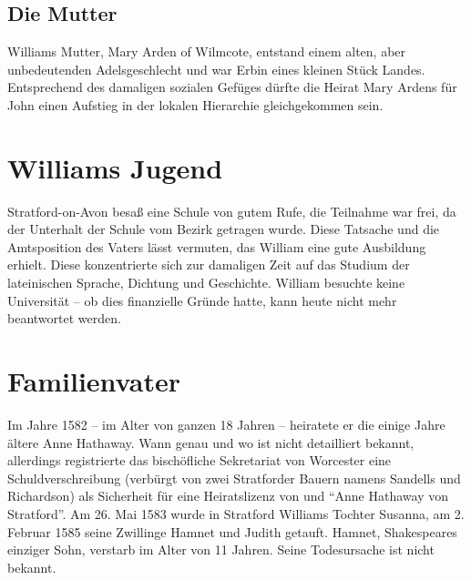 \subsection{Die Mutter}
\label{sub:Mutter}
Williams Mutter, Mary Arden of Wilmcote, entstand einem
alten, aber unbedeutenden Adelsgeschlecht und war Erbin eines kleinen Stück
Landes. Entsprechend des damaligen sozialen Gefüges dürfte die Heirat Mary
Ardens für John einen Aufstieg in der lokalen Hierarchie gleichgekommen sein.

\section{Williams Jugend}

Stratford-on-Avon besaß eine Schule von gutem Rufe, die Teilnahme war frei, da
der Unterhalt der Schule vom Bezirk getragen wurde. Diese Tatsache und die
Amtsposition des Vaters lässt vermuten, das William eine gute Ausbildung
erhielt. Diese konzentrierte sich zur damaligen Zeit auf das Studium der
lateinischen Sprache, Dichtung und Geschichte. William besuchte keine
Universität -- ob dies finanzielle Gründe hatte, kann heute nicht mehr
beantwortet werden.

\section{Familienvater}

Im Jahre 1582 -- im Alter von ganzen 18 Jahren -- heiratete er die einige Jahre
ältere Anne Hathaway. Wann genau und wo ist nicht detailliert bekannt,
allerdings registrierte das bischöfliche Sekretariat von Worcester eine
Schuldverschreibung (verbürgt von zwei Stratforder Bauern namens Sandells und
Richardson) als Sicherheit für eine Heiratslizenz von \WS und
"`Anne Hathaway von Stratford"'. Am 26. Mai 1583 wurde in Stratford Williams
Tochter Susanna, am 2. Februar 1585 seine Zwillinge Hamnet und Judith getauft.
Hamnet, Shakespeares einziger Sohn, verstarb im Alter von 11 Jahren. Seine
Todesursache ist nicht bekannt.
